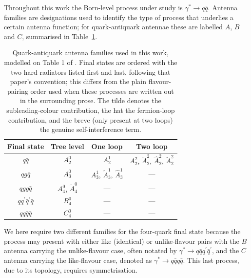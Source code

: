 Throughout this work the Born-level process under study is $\gamma^*\to q\bar q$.
Antenna families are designations used to identify the type of process that
underlies a certain antenna function; for quark-antiquark antennae these are
labelled $A$, $B$ and $C$, summarised in Table~\ref{tab:antFamilies}.

\begin{table}[h]
    \centering
    \renewcommand{\arraystretch}{1.3}
    \begin{tabular}{|c|c|c|c|}
        \hline
        \textbf{Final state} & \textbf{Tree level} & \textbf{One loop} & \textbf{Two loop} \\
        \hline
        $q\bar q$ & $A_2^0$ & $A_2^1$ & $A_2^2$, $\tilde A_2^2$, $\hat A_2^2$, $\breve A_2^2$ \\
        \hline
        $qg\bar q$ & $A_3^0$ & $A_3^1$, $\tilde A_3^1$, $\hat A_3^1$ & --- \\
        \hline
        $qgg\bar q$ & $A_4^0$, $\tilde A_4^0$ & --- & --- \\
        \hline
        $qq^\prime\bar q^\prime\bar q$ & $B_4^0$ & --- & --- \\
        \hline
        $qq\bar q\bar q$ & $C_4^0$ & --- & --- \\
        \hline
    \end{tabular}
    \caption{Quark-antiquark antenna families used in this work, modelled on Table 1 of
    \cite{Gehrmann-DeRidder:2005btv}. Final states are ordered with the two hard radiators
    listed first and last, following that paper's convention; this differs from the plain
    flavour-pairing order used when these processes are written out in the surrounding prose.
    The tilde denotes the subleading-colour contribution,
    the hat the fermion-loop contribution, and the breve (only present at two loops) the
    genuine self-interference term.}
    \label{tab:antFamilies}
\end{table}

We here require two different families for the four-quark final state because the
process may present with either like (identical) or unlike-flavour pairs with the 
$B$ antenna carrying the unlike-flavour case, often notated by 
$\gamma^*\to q\bar q q^\prime\bar q^\prime$, and the $C$ antenna carrying the 
like-flavour case, denoted as $\gamma^*\to q\bar q q\bar q$. This last process, 
due to its topology, requires symmetrisation. 


